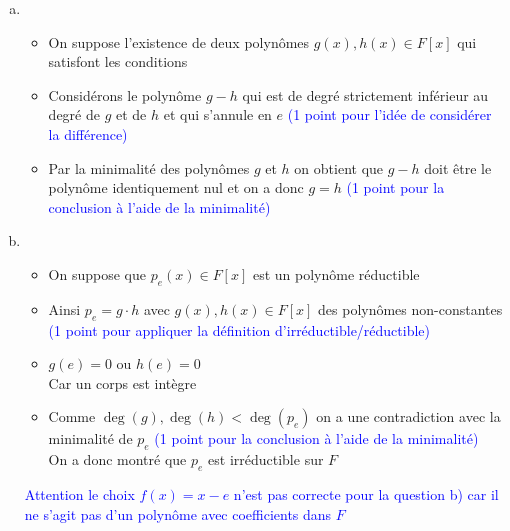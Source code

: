 \documentclass[11pt, a4paper, oneside]{article}
\newcommand{\indice}[1]{{\scriptsize \color{RubineRed} {#1}}}
\begin{document}
\begin{enumerate}[a)]
\item
\begin{itemize}
\item On suppose l'existence de deux polynômes $g(x),h(x) \in F[x]$ qui satisfont les conditions
\item Considérons le polynôme $g-h$ qui est de degré strictement inférieur au degré de $g$ et de $h$ et qui s'annule en $e$ \textcolor{blue}{(1 point pour l'idée de considérer la différence)}
\item Par la minimalité des polynômes $g$ et $h$ on obtient que $g-h$ doit être le polynôme identiquement nul et on a donc $g=h$ \textcolor{blue}{(1 point pour la conclusion à l'aide de la minimalité)}
\end{itemize}


\item
\begin{itemize}
\item On suppose que $p_e(x)\in F[x]$ est un polynôme réductible
\item Ainsi $p_e=g\cdot h$ avec $g(x),h(x) \in F[x]$ des polynômes non-constantes \textcolor{blue}{(1 point pour appliquer la définition d'irréductible/réductible)} 
\item $g(e) = 0$ ou $h(e) = 0$ \\ \indice{Car un corps est intègre}
\item Comme $\deg(g),\deg(h) < \deg(p_e)$ on a une contradiction avec la minimalité de $p_e$ \textcolor{blue}{(1 point pour la conclusion à l'aide de la minimalité)} \\
\indice{On a donc montré que $p_e$ est irréductible sur $F$} \\
\end{itemize}
\textcolor{blue}{Attention le choix $f(x)=x-e$ n'est pas correcte pour la question b) car il ne s'agit pas d'un polynôme avec coefficients dans $F$}
\end{enumerate}
\end{document}
